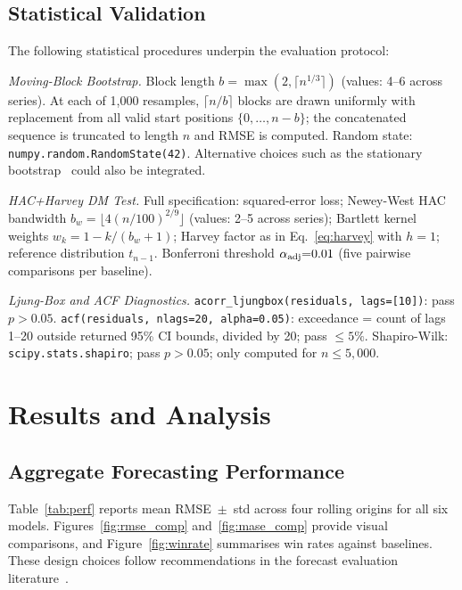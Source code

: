 \documentclass[sn-mathphys-num,pdflatex]{sn-jnl}
\begin{document}
\subsection{Statistical Validation}
\label{sec:statval}

The following statistical procedures underpin the evaluation protocol:

\textit{Moving-Block Bootstrap.}
Block length $b=\max(2,\lceil n^{1/3}\rceil)$ (values: 4--6 across
series).  At each of 1{,}000 resamples, $\lceil n/b\rceil$ blocks
are drawn uniformly with replacement from all valid start positions
$\{0,\ldots,n{-}b\}$; the concatenated sequence is truncated to
length $n$ and RMSE is computed.
Random state: \texttt{numpy.random.RandomState(42)}.
Alternative choices such as the stationary
bootstrap~\cite{politis1994stationary} could also be integrated.

\textit{HAC+Harvey DM Test.}
Full specification: squared-error loss; Newey-West HAC bandwidth
$b_w{=}\lfloor4(n/100)^{2/9}\rfloor$ (values: 2--5 across series);
Bartlett kernel weights $w_k{=}1{-}k/(b_w{+}1)$; Harvey factor
as in Eq.~\eqref{eq:harvey} with $h{=}1$; reference distribution
$t_{n-1}$.  Bonferroni threshold $\alpha_{\rm adj}{=}0.01$
(five pairwise comparisons per baseline).

\textit{Ljung-Box and ACF Diagnostics.}
\texttt{acorr\_ljungbox(residuals, lags=[10])}: pass $p{>}0.05$.
\texttt{acf(residuals, nlags=20, alpha=0.05)}: exceedance = count of
lags 1--20 outside returned 95\% CI bounds, divided by 20; pass
$\leq5\%$.  Shapiro-Wilk: \texttt{scipy.stats.shapiro}; pass $p{>}0.05$;
only computed for $n\leq5{,}000$.

\section{Results and Analysis}
\label{sec:results}

\subsection{Aggregate Forecasting Performance}
\label{sec:acc}

Table~\ref{tab:perf} reports mean RMSE~$\pm$~std across four rolling
origins for all six models. Figures~\ref{fig:rmse_comp}
and~\ref{fig:mase_comp} provide visual comparisons, and
Figure~\ref{fig:winrate} summarises win rates against baselines.
These design choices follow recommendations in the forecast
evaluation literature~\cite{tashman2000oos, hewamalage2023pitfalls}.
\end{document}
